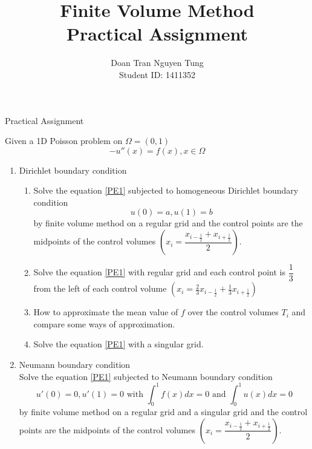 \documentclass{article}
\begin{document}
	\title{Finite Volume Method\\Practical Assignment}
	\author{Doan Tran Nguyen Tung\\
		Student ID: 1411352}
	\maketitle
	\tableofcontents
	\newpage
	\begin{center}
		\begin{Huge}
			Practical Assignment
		\end{Huge}
	\end{center}

	\noindent Given a 1D Poisson problem on $\Omega=(0,1)$
	\begin{equation}\label{PE1}
	-u''(x)=f(x), x\in\Omega
	\end{equation}

	\begin{enumerate}[leftmargin=*]
		\item Dirichlet boundary condition
		\begin{enumerate}[leftmargin=*,label=\alph*)]
			\item Solve the equation \eqref{PE1} subjected to homogeneous Dirichlet boundary condition
			\begin{equation}
			u(0)=a, u(1)=b
			\end{equation}
			by finite volume method on a regular grid and the control points are the midpoints of the control volumes $\left(x_i=\dfrac{x_{i-\frac{1}{2}}+x_{i+\frac{1}{2}}}{2}\right)$.

			\item Solve the equation \eqref{PE1} with regular grid and each control point is $\dfrac{1}{3}$ from the left of each control volume $\left(x_i=\frac{2}{3}x_{i-\frac{1}{2}}+\frac{1}{3}x_{i+\frac{1}{2}}\right)$

			\item How to approximate the mean value of $f$ over the control volumes $T_i$ and compare some ways of approximation.

			\item Solve the equation \eqref{PE1} with a singular grid.
		\end{enumerate}

		\item Neumann boundary condition\\
		Solve the equation \eqref{PE1} subjected to Neumann boundary condition
		\begin{equation}
		u'(0)=0, u'(1)=0 \mbox{ with } \int_{0}^{1}f(x)dx=0 \mbox{ and } \int_{0}^{1}u(x)dx=0
		\end{equation}
		by finite volume method on a regular grid and a singular grid and the control points are the midpoints of the control volumes $\left(x_i=\dfrac{x_{i-\frac{1}{2}}+x_{i+\frac{1}{2}}}{2}\right)$.
	\end{enumerate}
	\newpage
	\noindent
\end{document}
